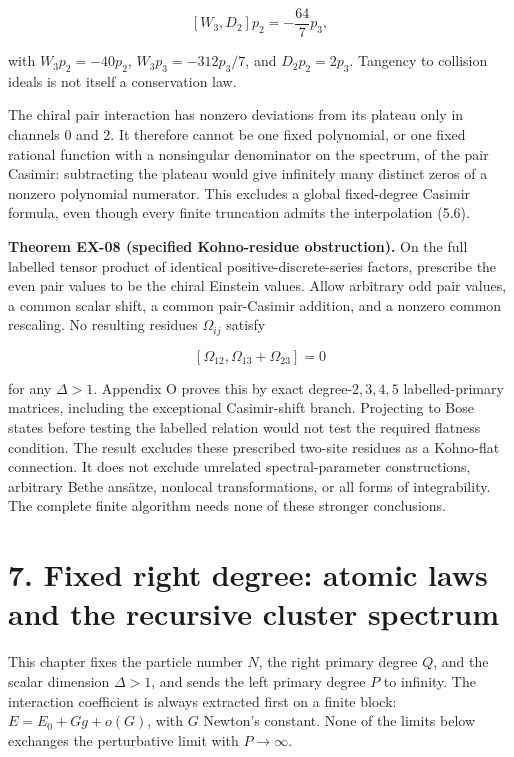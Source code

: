 \[
[W_3,D_2]p_2=-\frac{64}{7}p_3,
\tag{6.57}
\]

with \(W_3p_2=-40p_2\), \(W_3p_3=-312p_3/7\), and \(D_2p_2=2p_3\). Tangency to collision ideals is not itself a conservation law.

The chiral pair interaction has nonzero deviations from its plateau only in channels 0 and 2. It therefore cannot be one fixed polynomial, or one fixed rational function with a nonsingular denominator on the spectrum, of the pair Casimir: subtracting the plateau would give infinitely many distinct zeros of a nonzero polynomial numerator. This excludes a global fixed-degree Casimir formula, even though every finite truncation admits the interpolation (5.6).

\textbf{Theorem EX-08 (specified Kohno-residue obstruction).} On the full labelled tensor product of identical positive-discrete-series factors, prescribe the even pair values to be the chiral Einstein values. Allow arbitrary odd pair values, a common scalar shift, a common pair-Casimir addition, and a nonzero common rescaling. No resulting residues \(\Omega_{ij}\) satisfy

\[
[\Omega_{12},\Omega_{13}+\Omega_{23}]=0
\tag{6.58}
\]

for any \(\Delta>1\). Appendix O proves this by exact degree-\(2,3,4,5\) labelled-primary matrices, including the exceptional Casimir-shift branch. Projecting to Bose states before testing the labelled relation would not test the required flatness condition. The result excludes these prescribed two-site residues as a Kohno-flat connection. It does not exclude unrelated spectral-parameter constructions, arbitrary Bethe ansätze, nonlocal transformations, or all forms of integrability. The complete finite algorithm needs none of these stronger conclusions.

\clearpage
\hypertarget{fixed-right-degree-atomic-laws-and-the-recursive-cluster-spectrum}{%
\section{7. Fixed right degree: atomic laws and the recursive cluster spectrum}\label{fixed-right-degree-atomic-laws-and-the-recursive-cluster-spectrum}}

This chapter fixes the particle number \(N\), the right primary degree \(Q\), and the scalar dimension \(\Delta>1\), and sends the left primary degree \(P\) to infinity. The interaction coefficient is always extracted first on a finite block: \(E=E_0+Gg+o(G)\), with \(G\) Newton's constant. None of the limits below exchanges the perturbative limit with \(P\to\infty\).

